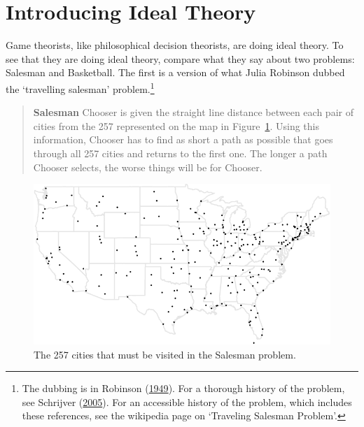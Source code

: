 \documentclass[
  12pt,
  letterpaper,
  DIV=11,
  numbers=noendperiod]{scrreprt}
\begin{document}
\hypertarget{sec-ideal-intro}{%
\section{Introducing Ideal Theory}\label{sec-ideal-intro}}

Game theorists, like philosophical decision theorists, are doing ideal
theory. To see that they are doing ideal theory, compare what they say
about two problems: Salesman and Basketball. The first is a version of
what Julia Robinson dubbed the `travelling salesman' problem.\footnote{The
  dubbing is in Robinson (\protect\hyperlink{ref-Robinson1949}{1949}).
  For a thorough history of the problem, see Schrijver
  (\protect\hyperlink{ref-Schrijver2005}{2005}). For an accessible
  history of the problem, which includes these references, see the
  wikipedia page on `Traveling Salesman Problem'.}

\begin{quote}
\textbf{Salesman} Chooser is given the straight line distance between
each pair of cities from the 257 represented on the map in
Figure~\ref{fig-salesman-points}. Using this information, Chooser has to
find as short a path as possible that goes through all 257 cities and
returns to the first one. The longer a path Chooser selects, the worse
things will be for Chooser.
\end{quote}

\begin{figure}

{\centering \includegraphics{idealised_files/figure-pdf/fig-salesman-points-1.pdf}

}

\caption{\label{fig-salesman-points}The 257 cities that must be visited
in the Salesman problem.}

\end{figure}
\end{document}

